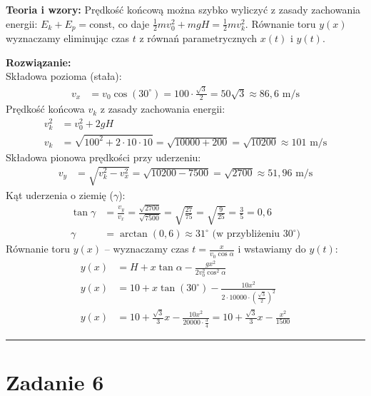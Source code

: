 \documentclass[11pt, a4paper]{article}
\begin{document}
\textbf{Teoria i wzory:}
Prędkość końcową można szybko wyliczyć z zasady zachowania energii: $E_k + E_p = \text{const}$, co daje $\frac{1}{2}mv_0^2 + mgH = \frac{1}{2}mv_k^2$. Równanie toru $y(x)$ wyznaczamy eliminując czas $t$ z równań parametrycznych $x(t)$ i $y(t)$.

\textbf{Rozwiązanie:} \\
Składowa pozioma (stała):
\begin{align*}
    v_x &= v_0 \cos(30^\circ) = 100 \cdot \frac{\sqrt{3}}{2} = 50\sqrt{3} \approx 86,6 \text{ m/s}
\end{align*}
Prędkość końcowa $v_k$ z zasady zachowania energii:
\begin{align*}
    v_k^2 &= v_0^2 + 2gH \\
    v_k &= \sqrt{100^2 + 2 \cdot 10 \cdot 10} = \sqrt{10000 + 200} = \sqrt{10200} \approx 101 \text{ m/s}
\end{align*}
Składowa pionowa prędkości przy uderzeniu:
\begin{align*}
    v_y &= \sqrt{v_k^2 - v_x^2} = \sqrt{10200 - 7500} = \sqrt{2700} \approx 51,96 \text{ m/s}
\end{align*}
Kąt uderzenia o ziemię ($\gamma$):
\begin{align*}
    \tan\gamma &= \frac{v_y}{v_x} = \frac{\sqrt{2700}}{\sqrt{7500}} = \sqrt{\frac{27}{75}} = \sqrt{\frac{9}{25}} = \frac{3}{5} = 0,6 \\
    \gamma &= \arctan(0,6) \approx 31^\circ \text{ (w przybliżeniu } 30^\circ\text{)}
\end{align*}
Równanie toru $y(x)$ -- wyznaczamy czas $t = \frac{x}{v_0 \cos\alpha}$ i wstawiamy do $y(t)$:
\begin{align*}
    y(x) &= H + x \tan\alpha - \frac{gx^2}{2v_0^2 \cos^2\alpha} \\
    y(x) &= 10 + x \tan(30^\circ) - \frac{10 x^2}{2 \cdot 10000 \cdot \left(\frac{\sqrt{3}}{2}\right)^2} \\
    y(x) &= 10 + \frac{\sqrt{3}}{3}x - \frac{10 x^2}{20000 \cdot \frac{3}{4}} = 10 + \frac{\sqrt{3}}{3}x - \frac{x^2}{1500}
\end{align*}

\vspace{0.5cm}
\hrule
\vspace{0.5cm}

\section*{Zadanie 6}
\end{document}
